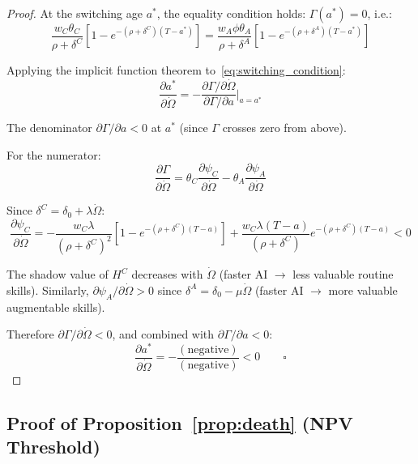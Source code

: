 \documentclass[11pt,a4paper]{article}
\theoremstyle{definition}
\begin{document}
\begin{proof}
At the switching age $a^*$, the equality condition holds: $\Gamma(a^*) = 0$, i.e.:
\begin{equation}
\frac{w_C \theta_C}{\rho + \delta^C} \left[ 1 - e^{-(\rho+\delta^C)(T-a^*)} \right] = \frac{w_A \phi \theta_A}{\rho + \delta^A} \left[ 1 - e^{-(\rho+\delta^A)(T-a^*)} \right]
\label{eq:switching_condition}
\end{equation}

Applying the implicit function theorem to~\eqref{eq:switching_condition}:
\begin{equation}
\frac{\partial a^*}{\partial \dot{\Omega}} = -\frac{\partial \Gamma / \partial \dot{\Omega}}{\partial \Gamma / \partial a} \bigg|_{a=a^*}
\end{equation}

The denominator $\partial \Gamma / \partial a < 0$ at $a^*$ (since $\Gamma$ crosses zero from above).

For the numerator:
\begin{equation}
\frac{\partial \Gamma}{\partial \dot{\Omega}} = \theta_C \frac{\partial \psi_C}{\partial \dot{\Omega}} - \theta_A \frac{\partial \psi_A}{\partial \dot{\Omega}}
\end{equation}

Since $\delta^C = \delta_0 + \lambda \dot{\Omega}$:
\begin{equation}
\frac{\partial \psi_C}{\partial \dot{\Omega}} = -\frac{w_C \lambda}{(\rho + \delta^C)^2} \left[ 1 - e^{-(\rho+\delta^C)(T-a)} \right] + \frac{w_C \lambda (T-a)}{(\rho+\delta^C)} e^{-(\rho+\delta^C)(T-a)} < 0
\end{equation}

The shadow value of $H^C$ decreases with $\dot{\Omega}$ (faster AI $\to$ less valuable routine skills). Similarly, $\partial \psi_A / \partial \dot{\Omega} > 0$ since $\delta^A = \delta_0 - \mu \dot{\Omega}$ (faster AI $\to$ more valuable augmentable skills).

Therefore $\partial \Gamma / \partial \dot{\Omega} < 0$, and combined with $\partial \Gamma / \partial a < 0$:
\begin{equation}
\frac{\partial a^*}{\partial \dot{\Omega}} = -\frac{(\text{negative})}{(\text{negative})} < 0 \qquad \square
\end{equation}
\end{proof}

\subsection{Proof of Proposition~\ref{prop:death} (NPV Threshold)}
\end{document}
